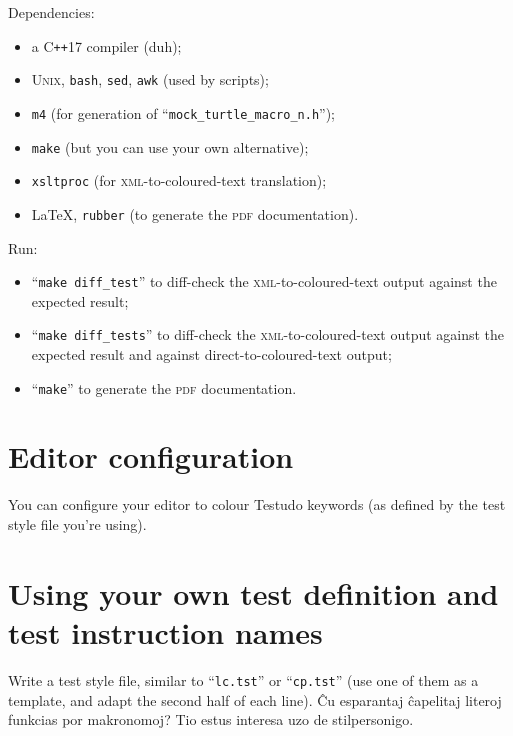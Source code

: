 \documentclass[twoside, a4paper, article]{memoir}
\newcommand*\Cpp{C\texttt{++}}
\begin{document}
Dependencies:
\begin{itemize}
\item a \Cpp{}17 compiler (duh);
\item \textsc{Unix}, \texttt{bash}, \texttt{sed}, \texttt{awk} (used by
  scripts);
\item \texttt{m4} (for generation of ``\texttt{mock\_turtle\_macro\_n.h}'');
\item \texttt{make} (but you can use your own alternative);
\item \texttt{xsltproc} (for \textsc{xml}-to-coloured-text translation);
\item \LaTeX{}, \texttt{rubber} (to generate the \textsc{pdf} documentation).
\end{itemize}

Run:
\begin{itemize}
\item ``\texttt{make diff\_test}'' to diff-check the
  \textsc{xml}-to-coloured-text output against the expected result;
\item ``\texttt{make diff\_tests}'' to diff-check the
  \textsc{xml}-to-coloured-text output against the expected result and against
  direct-to-coloured-text output;
\item ``\texttt{make}'' to generate the \textsc{pdf} documentation.
\end{itemize}

\chapter{Editor configuration}
\label{cha:editor-configuration}

You can configure your editor to colour Testudo keywords (as defined by the
test style file you're using).


\chapter{Using your own test definition and test
  instruction names}
\label{cha:using-your-own-test-definition-test-instruction-names}

Write a test style file, similar to ``\texttt{lc.tst}'' or ``\texttt{cp.tst}''
(use one of them as a template, and adapt the second half of each line).  Ĉu
esparantaj ĉapelitaj literoj funkcias por makronomoj?  Tio estus interesa uzo
de stilpersonigo.


\backmatter
\end{document}
